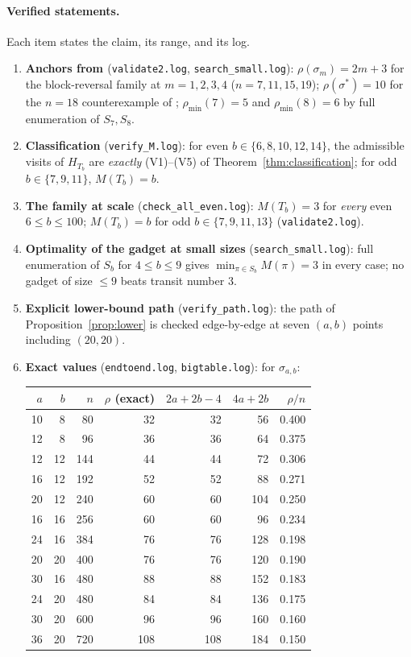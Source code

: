 \documentclass[11pt]{article}
\theoremstyle{definition}
\newcommand{\pmin}{\rho_{\min}}
\begin{document}
\paragraph{Verified statements.} Each item states the claim, its range, and its log.
\begin{enumerate}
\item \textbf{Anchors from \cite{Liz26}} (\texttt{validate2.log},
\texttt{search\_small.log}): $\rho(\sigma_m) = 2m + 3$ for the block-reversal family
at $m = 1, 2, 3, 4$ ($n = 7, 11, 15, 19$); $\rho(\sigma^*) = 10$ for the $n = 18$
counterexample of \cite{Liz26}; $\pmin(7) = 5$ and $\pmin(8) = 6$ by full
enumeration of $S_7, S_8$.
\item \textbf{Classification} (\texttt{verify\_M.log}): for even
$b \in \{6, 8, 10, 12, 14\}$, the admissible visits of $H_{T_b}$ are \emph{exactly}
(V1)--(V5) of Theorem~\ref{thm:classification}; for odd $b \in \{7, 9, 11\}$,
$M(T_b) = b$.
\item \textbf{The family at scale} (\texttt{check\_all\_even.log}): $M(T_b) = 3$
for \emph{every} even $6 \le b \le 100$; $M(T_b) = b$ for odd $b \in \{7,9,11,13\}$
(\texttt{validate2.log}).
\item \textbf{Optimality of the gadget at small sizes}
(\texttt{search\_small.log}): full enumeration of $S_b$ for $4 \le b \le 9$ gives
$\min_{\pi \in S_b} M(\pi) = 3$ in every case; no gadget of size $\le 9$ beats
transit number $3$.
\item \textbf{Explicit lower-bound path} (\texttt{verify\_path.log}): the path of
Proposition~\ref{prop:lower} is checked edge-by-edge at seven $(a,b)$ points
including $(20,20)$.
\item \textbf{Exact values} (\texttt{endtoend.log}, \texttt{bigtable.log}): for
$\sigma_{a,b}$:

\begin{center}
\begin{tabular}{rrrrrrr}
\toprule
$a$ & $b$ & $n$ & $\rho$ (exact) & $2a{+}2b{-}4$ & $4a{+}2b$ & $\rho/n$ \\
\midrule
10 & 8  & 80  & 32 & 32 & 56  & 0.400 \\
12 & 8  & 96  & 36 & 36 & 64  & 0.375 \\
12 & 12 & 144 & 44 & 44 & 72  & 0.306 \\
16 & 12 & 192 & 52 & 52 & 88  & 0.271 \\
20 & 12 & 240 & 60 & 60 & 104 & 0.250 \\
16 & 16 & 256 & 60 & 60 & 96  & 0.234 \\
24 & 16 & 384 & 76 & 76 & 128 & 0.198 \\
20 & 20 & 400 & 76 & 76 & 120 & 0.190 \\
30 & 16 & 480 & 88 & 88 & 152 & 0.183 \\
24 & 20 & 480 & 84 & 84 & 136 & 0.175 \\
30 & 20 & 600 & 96 & 96 & 160 & 0.160 \\
36 & 20 & 720 & 108 & 108 & 184 & 0.150 \\
\bottomrule
\end{tabular}
\end{center}


\end{enumerate}
\end{document}
